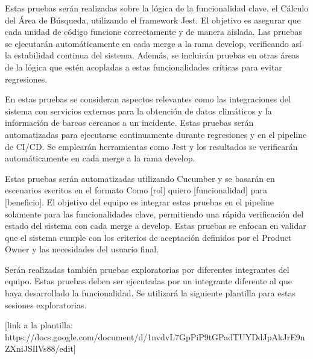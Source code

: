 Estas pruebas serán realizadas sobre la lógica de la funcionalidad clave, el Cálculo del Área de Búsqueda, utilizando 
el framework Jest. El objetivo es asegurar que cada unidad de código funcione correctamente y de manera aislada. 
Las pruebas se ejecutarán automáticamente en cada merge a la rama develop, verificando así la estabilidad continua del sistema. 
Además, se incluirán pruebas en otras áreas de la lógica que estén acopladas a estas funcionalidades críticas para evitar regresiones.

En estas pruebas se consideran aspectos relevantes como las integraciones del sistema con servicios externos para la obtención de datos 
climáticos y la información de barcos cercanos a un incidente. Estas pruebas serán automatizadas para ejecutarse continuamente durante 
regresiones y en el pipeline de CI/CD. Se emplearán herramientas como Jest y los resultados se verificarán automáticamente en cada merge 
a la rama develop.

Estas pruebas serán automatizadas utilizando Cucumber y se basarán en escenarios escritos en el formato Como [rol] quiero [funcionalidad] 
para [beneficio]. El objetivo del equipo es integrar estas pruebas en el pipeline solamente para las funcionalidades clave, permitiendo 
una rápida verificación del estado del sistema con cada merge a develop. Estas pruebas se enfocan en validar que el sistema cumple con los 
criterios de aceptación definidos por el Product Owner y las necesidades del usuario final.

Serán realizadas también pruebas exploratorias por diferentes integrantes del equipo. Estas pruebas deben ser ejecutadas por un integrante 
diferente al que haya desarrollado la funcionalidad.
Se utilizará la siguiente plantilla para estas sesiones exploratorias.

[link a la plantilla: https://docs.google.com/document/d/1nvdvL7GpPiP9tGPadTUYDdJpAkJrE9nZXniJSIlVs88/edit]

